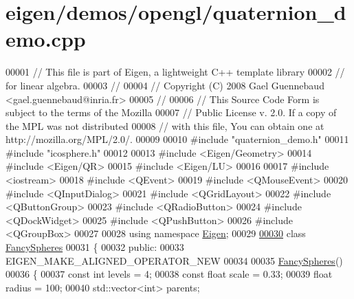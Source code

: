 \hypertarget{eigen_2demos_2opengl_2quaternion__demo_8cpp_source}{}\section{eigen/demos/opengl/quaternion\+\_\+demo.cpp}
\label{eigen_2demos_2opengl_2quaternion__demo_8cpp_source}

\begin{DoxyCode}
00001 \textcolor{comment}{// This file is part of Eigen, a lightweight C++ template library}
00002 \textcolor{comment}{// for linear algebra.}
00003 \textcolor{comment}{//}
00004 \textcolor{comment}{// Copyright (C) 2008 Gael Guennebaud <gael.guennebaud@inria.fr>}
00005 \textcolor{comment}{//}
00006 \textcolor{comment}{// This Source Code Form is subject to the terms of the Mozilla}
00007 \textcolor{comment}{// Public License v. 2.0. If a copy of the MPL was not distributed}
00008 \textcolor{comment}{// with this file, You can obtain one at http://mozilla.org/MPL/2.0/.}
00009 
00010 \textcolor{preprocessor}{#include "quaternion\_demo.h"}
00011 \textcolor{preprocessor}{#include "icosphere.h"}
00012 
00013 \textcolor{preprocessor}{#include <Eigen/Geometry>}
00014 \textcolor{preprocessor}{#include <Eigen/QR>}
00015 \textcolor{preprocessor}{#include <Eigen/LU>}
00016 
00017 \textcolor{preprocessor}{#include <iostream>}
00018 \textcolor{preprocessor}{#include <QEvent>}
00019 \textcolor{preprocessor}{#include <QMouseEvent>}
00020 \textcolor{preprocessor}{#include <QInputDialog>}
00021 \textcolor{preprocessor}{#include <QGridLayout>}
00022 \textcolor{preprocessor}{#include <QButtonGroup>}
00023 \textcolor{preprocessor}{#include <QRadioButton>}
00024 \textcolor{preprocessor}{#include <QDockWidget>}
00025 \textcolor{preprocessor}{#include <QPushButton>}
00026 \textcolor{preprocessor}{#include <QGroupBox>}
00027 
00028 \textcolor{keyword}{using namespace }\hyperlink{namespace_eigen}{Eigen};
00029 
\hyperlink{class_fancy_spheres}{00030} \textcolor{keyword}{class }\hyperlink{class_fancy_spheres}{FancySpheres}
00031 \{
00032   \textcolor{keyword}{public}:
00033     EIGEN\_MAKE\_ALIGNED\_OPERATOR\_NEW
00034     
00035     \hyperlink{class_fancy_spheres}{FancySpheres}()
00036     \{
00037       \textcolor{keyword}{const} \textcolor{keywordtype}{int} levels = 4;
00038       \textcolor{keyword}{const} \textcolor{keywordtype}{float} scale = 0.33;
00039       \textcolor{keywordtype}{float} radius = 100;
00040       std::vector<int> parents;

\end{DoxyCode}
